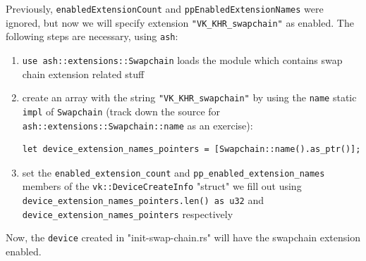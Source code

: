 \documentclass[12pt,letterpaper]{article}
\newcommand{\ril}[1]{\texttt{#1}}
\newcommand{\cil}[1]{\texttt{#1}}
\newcommand{\ash}{\texttt{ash}}
\begin{document}
	Previously, \cil{enabledExtensionCount} and \cil{ppEnabledExtensionNames} were ignored, but now we will specify extension \texttt{"VK\_KHR\_swapchain"} as enabled. The following steps are necessary, using \ash:
		\begin{enumerate}
			\item \ril{use ash::extensions::Swapchain} loads the module which contains swap chain extension related stuff
				
			\item create an array with the string \texttt{"VK\_KHR\_swapchain"} by using the \ril{name} static \ril{impl} of \ril{Swapchain} (track down the source for \ril{ash::extensions::Swapchain::name} as an exercise): 
\begin{verbatim}
let device_extension_names_pointers = [Swapchain::name().as_ptr()];
\end{verbatim}
			
			\item set the \ril{enabled_extension_count} and \ril{pp_enabled_extension_names} members of the \ril{vk::DeviceCreateInfo} "struct" we fill out using \ril{device_extension_names_pointers.len() as u32} and \ril{device_extension_names_pointers} respectively
		\end{enumerate}
	
	Now, the \ril{device} created in "init-swap-chain.rs" will have the swapchain extension enabled. 
	
\end{document}
